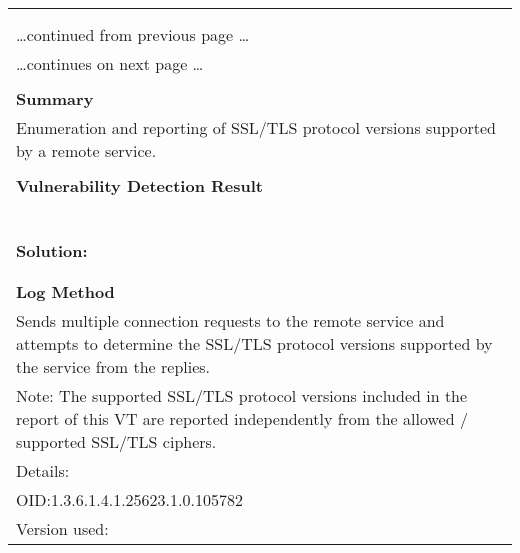 \documentclass{article}
\begin{document}
\begin{longtable}{|p{}|}
\hline
\rowcolor{gvm_log}{\color{white}{Log (CVSS: 0.0) }}\\
\rowcolor{gvm_log}{\color{white}{NVT: SSL/TLS: Version Detection}}\\
\hline
\endfirsthead
\hfill\ldots continued from previous page \ldots \\
\hline
\endhead
\hline
\ldots continues on next page \ldots \\
\endfoot
\hline
\endlastfoot
\\
\textbf{Summary}\\
Enumeration and reporting of SSL/TLS protocol versions supported
  by a remote service.\\

        \hline
        \\
\textbf{Vulnerability Detection Result}\\
\rowcolor{white}{\verb=The remote SSL/TLS service supports the following SSL/TLS protocol version(s):=}\\
\rowcolor{white}{\verb=TLSv1.0=}\\
\rowcolor{white}{\verb=TLSv1.1=}\\
\rowcolor{white}{\verb=TLSv1.2=}\\
\rowcolor{white}{\verb=TLSv1.3=}\\

          \hline
          \\
\textbf{Solution:}\\
\\


        \hline
        \\
\textbf{Log Method}\\
Sends multiple connection requests to the remote service and
  attempts to determine the SSL/TLS protocol versions supported by the service from the replies.\\
  Note: The supported SSL/TLS protocol versions included in the report of this VT are reported
  independently from the allowed / supported SSL/TLS ciphers.\\
Details:
\rowcolor{white}{\verb=SSL/TLS: Version Detection=}\\
OID:1.3.6.1.4.1.25623.1.0.105782\\
Version used:
\rowcolor{white}{\verb=2021-12-06T15:42:24Z=}\\
\end{longtable}
\end{document}
